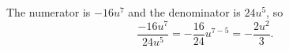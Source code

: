 The numerator is $-16u^7$ and the denominator is $24u^5$, so
\[
\dfrac{-16u^7}{24u^5}=-\dfrac{16}{24}u^{7-5}=\boxed{-\dfrac{2u^2}{3}}.
\]
